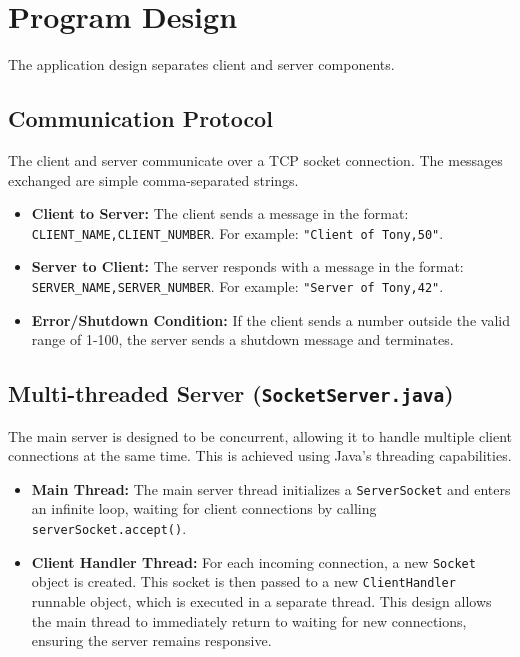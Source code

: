 \documentclass{article}
\begin{document}
\section{Program Design}

The application design separates client and server components.

\subsection{Communication Protocol}
The client and server communicate over a TCP socket connection. The messages exchanged are simple comma-separated strings.
\begin{itemize}
    \item \textbf{Client to Server:} The client sends a message in the format: \texttt{CLIENT\_NAME,CLIENT\_NUMBER}. For example: \texttt{"Client of Tony,50"}.
    \item \textbf{Server to Client:} The server responds with a message in the format: \texttt{SERVER\_NAME,SERVER\_NUMBER}. For example: \texttt{"Server of Tony,42"}.
    \item \textbf{Error/Shutdown Condition:} If the client sends a number outside the valid range of 1-100, the server sends a shutdown message and terminates.
\end{itemize}

\subsection{Multi-threaded Server (\texttt{SocketServer.java})}
The main server is designed to be concurrent, allowing it to handle multiple client connections at the same time. This is achieved using Java's threading capabilities.

\begin{itemize}
    \item \textbf{Main Thread:} The main server thread initializes a \texttt{ServerSocket} and enters an infinite loop, waiting for client connections by calling \texttt{serverSocket.accept()}.
    \item \textbf{Client Handler Thread:} For each incoming connection, a new \texttt{Socket} object is created. This socket is then passed to a new \texttt{ClientHandler} runnable object, which is executed in a separate thread. This design allows the main thread to immediately return to waiting for new connections, ensuring the server remains responsive.
\end{itemize}
\end{document}
